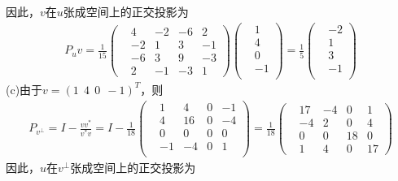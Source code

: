 \documentclass[UTF8,12pt, a4paper]{ctexart}
\begin{document}
因此，$v$在$u$张成空间上的正交投影为
\begin{align*}
    P_uv=\frac{1}{15}
    \left(
      \begin{matrix}
        &4 &-2 &-6 &2 \\
        &-2 &1 &3 &-1 \\
        &-6 &3 &9 &-3 \\
        &2 &-1 &-3 &1 
      \end{matrix}
    \right)
    \left(
      \begin{matrix}
        &1 \\
        &4 \\
        &0 \\
        &-1 \\
      \end{matrix}
    \right)
    =\frac{1}{5}\left(
      \begin{matrix}
        &-2 \\
        &1 \\
        &3 \\
        &-1 \\
      \end{matrix}
    \right)
\end{align*}
(c)由于$v=(1\ \ 4 \ \ 0 \ \ -1)^T$，则
\begin{align*}
  P_{v^\perp} =I - \frac{vv^*}{v^*v}= I-
  \frac{1}{18}
  \left(
    \begin{matrix}
      &1 &4 &0 &-1 \\
      &4 &16 &0 &-4 \\
      &0 &0 &0 &0 \\
      &-1 &-4 &0 &1 \\
    \end{matrix}
  \right)
  =\frac{1}{18}
  \left(
    \begin{matrix}
      &17 &-4 &0 &1 \\
      &-4 &2 &0 &4 \\
      &0 &0 &18 &0 \\
      &1 &4 &0 &17 
    \end{matrix}
  \right)
\end{align*}
因此，$u$在$v^\perp$张成空间上的正交投影为
\end{document}
